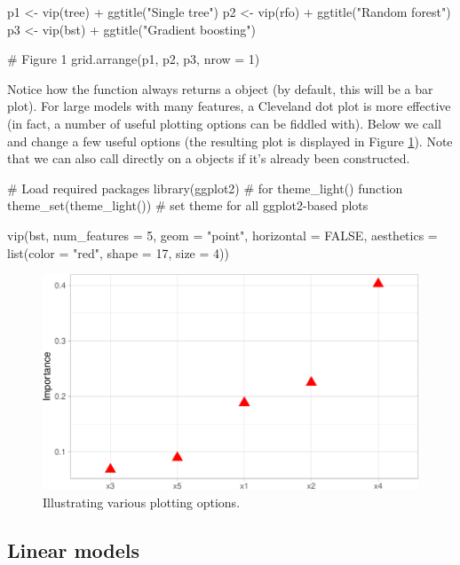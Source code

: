 \begin{Schunk}
\begin{Sinput}
p1 <- vip(tree) + ggtitle("Single tree")
p2 <- vip(rfo) + ggtitle("Random forest")
p3 <- vip(bst) + ggtitle("Gradient boosting")

# Figure 1
grid.arrange(p1, p2, p3, nrow = 1)
\end{Sinput}
\end{Schunk}

Notice how the  function always returns a 
object (by default, this will be a bar plot). For large models with many
features, a Cleveland dot plot is more effective (in fact, a number of
useful plotting options can be fiddled with). Below we call 
and change a few useful options (the resulting plot is displayed in
Figure \ref{fig:dot-plot}). Note that we can also call 
directly on a  objects if it's already been constructed.

\begin{Schunk}
\begin{Sinput}
# Load required packages
library(ggplot2)  # for theme_light() function
theme_set(theme_light())  # set theme for all ggplot2-based plots

vip(bst, num_features = 5, geom = "point", horizontal = FALSE, 
    aesthetics = list(color = "red", shape = 17, size = 4)) 
\end{Sinput}
\begin{figure}[!htb]

{\centering \includegraphics[width=0.7\linewidth]{greenwell-boehmke_files/figure-latex/dot-plot-1} 

}

\caption[Illustrating various plotting options]{Illustrating various plotting options.}\label{fig:dot-plot}
\end{figure}
\end{Schunk}

\hypertarget{linear-models}{%
\subsection{Linear models}\label{linear-models}}

